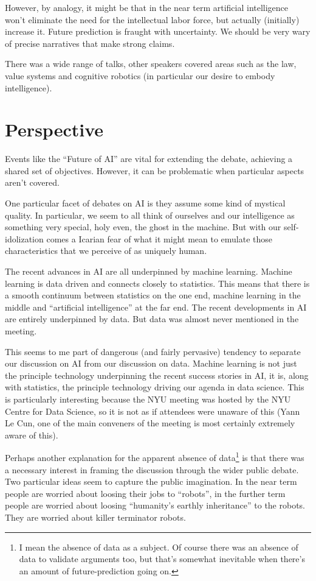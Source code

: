 \documentclass[a4paper]{caesar_book}
\begin{document}
However, by analogy, it might be that in the near term artificial intelligence won’t eliminate the need for the intellectual labor force, but actually (initially) increase it. Future prediction is fraught with uncertainty. We should be very wary of precise narratives that make strong claims.

There was a wide range of talks, other speakers covered areas such as the law, value systems and cognitive robotics (in particular our desire to embody intelligence).

\section{Perspective}

Events like the ``Future of AI'' are vital for extending the debate, achieving a shared set of objectives. However, it can be problematic when particular aspects aren't covered.

One particular facet of debates on AI is they assume some kind of mystical quality. In particular, we seem to all think of ourselves and our intelligence as something very special, holy even, the ghost in the machine. But with our self-idolization comes a Icarian fear of what it might mean to emulate those characteristics that we perceive of as uniquely human.

The recent advances in AI are all underpinned by machine learning. Machine learning is data driven and connects closely to statistics. This means that there is a smooth continuum between statistics on the one end, machine learning in the middle and ``artificial intelligence'' at the far end. The recent developments in AI are entirely underpinned by data. But data was almost never mentioned in the meeting.

This seems to me part of dangerous (and fairly pervasive) tendency to separate our discussion on AI from our discussion on data. Machine learning is not just the principle technology underpinning the recent success stories in AI, it is, along with statistics, the principle technology driving our agenda in data science. This is particularly interesting because the NYU meeting was hosted by the NYU Centre for Data Science, so it is not as if attendees were unaware of this (Yann Le Cun, one of the main conveners of the meeting is most certainly extremely aware of this).

Perhaps another explanation for the apparent absence of data\footnote{I mean the absence of data as a subject. Of course there was an absence of data to validate arguments too, but that’s somewhat inevitable when there’s an amount of future-prediction going on.} is that there was a necessary interest in framing the discussion through the wider public debate. Two particular ideas seem to capture the public imagination. In the near term people are worried about loosing their jobs to “robots”, in the further term people are worried about loosing ``humanity’s earthly inheritance'' to the robots. They are worried about killer terminator robots.
\end{document}
